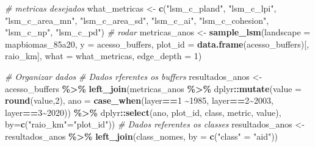 \documentclass[
]{article}
\newenvironment{Shaded}{\begin{snugshade}}{\end{snugshade}}
\newcommand{\AttributeTok}[1]{\textcolor[rgb]{0.13,0.29,0.53}{#1}}
\newcommand{\CommentTok}[1]{\textcolor[rgb]{0.56,0.35,0.01}{\textit{#1}}}
\newcommand{\DecValTok}[1]{\textcolor[rgb]{0.00,0.00,0.81}{#1}}
\newcommand{\FunctionTok}[1]{\textcolor[rgb]{0.13,0.29,0.53}{\textbf{#1}}}
\newcommand{\NormalTok}[1]{#1}
\newcommand{\OtherTok}[1]{\textcolor[rgb]{0.56,0.35,0.01}{#1}}
\newcommand{\SpecialCharTok}[1]{\textcolor[rgb]{0.81,0.36,0.00}{\textbf{#1}}}
\newcommand{\StringTok}[1]{\textcolor[rgb]{0.31,0.60,0.02}{#1}}
\begin{document}
\begin{Shaded}
\begin{Highlighting}[]
\CommentTok{\# metricas desejados}
\NormalTok{what\_metricas }\OtherTok{\textless{}{-}} \FunctionTok{c}\NormalTok{(}\StringTok{"lsm\_c\_pland"}\NormalTok{, }\StringTok{"lsm\_c\_lpi"}\NormalTok{, }\StringTok{"lsm\_c\_area\_mn"}\NormalTok{, }\StringTok{"lsm\_c\_area\_sd"}\NormalTok{, }
                   \StringTok{"lsm\_c\_ai"}\NormalTok{, }\StringTok{"lsm\_c\_cohesion"}\NormalTok{, }\StringTok{"lsm\_c\_np"}\NormalTok{, }\StringTok{"lsm\_c\_pd"}\NormalTok{)}
\CommentTok{\# rodar}
\NormalTok{metricas\_anos }\OtherTok{\textless{}{-}} \FunctionTok{sample\_lsm}\NormalTok{(}\AttributeTok{landscape =}\NormalTok{ mapbiomas\_85a20, }
                            \AttributeTok{y =}\NormalTok{ acesso\_buffers,}
                           \AttributeTok{plot\_id =} \FunctionTok{data.frame}\NormalTok{(acesso\_buffers)[, }\StringTok{\textquotesingle{}raio\_km\textquotesingle{}}\NormalTok{],}
                             \AttributeTok{what =}\NormalTok{ what\_metricas, }
                           \AttributeTok{edge\_depth =} \DecValTok{1}\NormalTok{)}

\CommentTok{\# Organizar dados}
\CommentTok{\# Dados rferentes os buffers}
\NormalTok{resultados\_anos }\OtherTok{\textless{}{-}}\NormalTok{ acesso\_buffers }\SpecialCharTok{\%\textgreater{}\%} 
  \FunctionTok{left\_join}\NormalTok{(metricas\_anos }\SpecialCharTok{\%\textgreater{}\%}
\NormalTok{              dplyr}\SpecialCharTok{::}\FunctionTok{mutate}\NormalTok{(}\AttributeTok{value =} \FunctionTok{round}\NormalTok{(value,}\DecValTok{2}\NormalTok{), }
         \AttributeTok{ano =} \FunctionTok{case\_when}\NormalTok{(layer}\SpecialCharTok{==}\DecValTok{1} \SpecialCharTok{\textasciitilde{}}\DecValTok{1985}\NormalTok{, }
\NormalTok{                         layer}\SpecialCharTok{==}\DecValTok{2}\SpecialCharTok{\textasciitilde{}}\DecValTok{2003}\NormalTok{, }
\NormalTok{                         layer}\SpecialCharTok{==}\DecValTok{3}\SpecialCharTok{\textasciitilde{}}\DecValTok{2020}\NormalTok{)) }\SpecialCharTok{\%\textgreater{}\%}
\NormalTok{              dplyr}\SpecialCharTok{::}\FunctionTok{select}\NormalTok{(ano, plot\_id, class, metric, value), }
            \AttributeTok{by=}\FunctionTok{c}\NormalTok{(}\StringTok{"raio\_km"}\OtherTok{=}\StringTok{"plot\_id"}\NormalTok{))}
\CommentTok{\# Dados referentes os classes}
\NormalTok{resultados\_anos }\OtherTok{\textless{}{-}}\NormalTok{ resultados\_anos }\SpecialCharTok{\%\textgreater{}\%}
\FunctionTok{left\_join}\NormalTok{(class\_nomes, }\AttributeTok{by =} \FunctionTok{c}\NormalTok{(}\StringTok{"class"} \OtherTok{=} \StringTok{"aid"}\NormalTok{))}
\end{Highlighting}
\end{Shaded}
\end{document}
